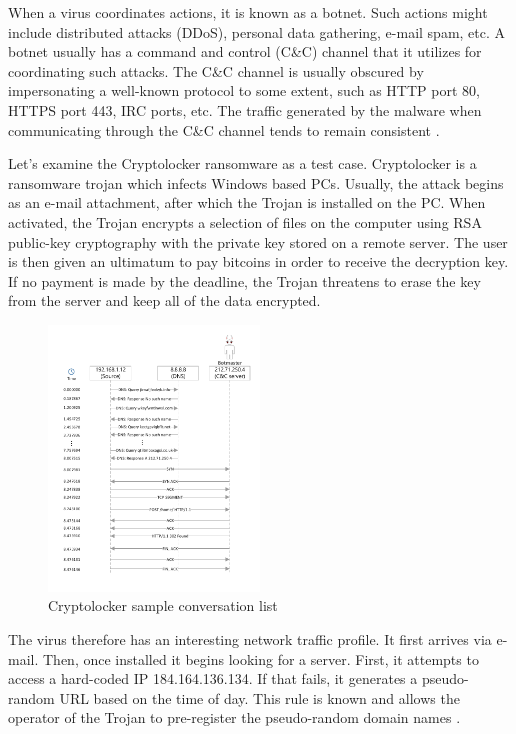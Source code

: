\documentclass[9pt,journal,compsoc]{IEEEtran}
\begin{document}
When a virus coordinates actions, it is known as a botnet. Such actions might include distributed attacks (DDoS), personal data gathering, e-mail spam, etc. A botnet usually has a command and control (C\&C) channel that it utilizes for coordinating such attacks.
The C\&C channel is usually obscured by impersonating a well-known protocol to some extent, such as HTTP port 80, HTTPS port 443, IRC ports, etc.
The traffic generated by the malware when communicating through the C\&C channel tends to remain consistent \cite{Vil12}.

Let’s examine the Cryptolocker ransomware as a test case. Cryptolocker is a ransomware trojan which infects Windows based PCs. Usually, the attack begins as an e-mail attachment, after which the Trojan is installed on the PC. When activated, the Trojan encrypts a selection of files on the computer using RSA public-key cryptography with the private key stored on a remote server. The user is then given an ultimatum to pay bitcoins in order to receive the decryption key. If no payment is made by the deadline, the Trojan threatens to erase the key from the server and keep all of the data encrypted.

\begin{figure}[!ht]
 \centering
 \includegraphics[width=0.5\textwidth]{fig1.pdf}
 \caption{Cryptolocker sample conversation list\label{fig:cryptolockerconv}}
\end{figure} 

The virus therefore has an interesting network traffic profile. It first arrives via e-mail. Then, once installed it begins looking for a server. First, it attempts to access a hard-coded IP 184.164.136.134. If that fails, it generates a pseudo-random URL based on the time of day. This rule is known and allows the operator of the Trojan to pre-register the pseudo-random domain names \cite{EMS13}.
\end{document}
